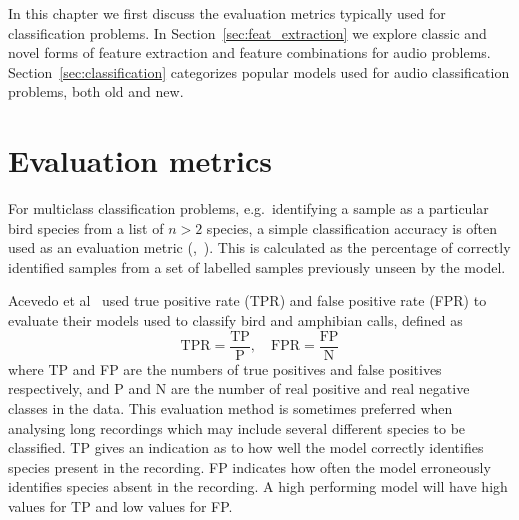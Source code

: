 In this chapter we first discuss the evaluation metrics typically used for
classification problems. In Section~\ref{sec:feat_extraction} we explore classic
and novel forms of feature extraction and feature combinations for audio
problems. Section~\ref{sec:classification} categorizes popular models used for
audio classification problems, both old and new.

\section{Evaluation metrics}\label{sec:eval_metrics}

For multiclass classification problems, e.g.\ identifying a sample as a
particular bird species from a list of $n > 2$ species, a simple classification
accuracy is often used as an evaluation metric
(\cite{chakraborty2016bird},~\cite{ramashini2022robust}). This is calculated as
the percentage of correctly identified samples from a set of labelled samples
previously unseen by the model.

Acevedo et al~\cite{acevedo2009automated} used true positive rate (TPR) and false
positive rate (FPR) to evaluate their models used to classify bird and amphibian
calls, defined as
\begin{equation}
  \text{TPR} = \frac{\text{TP}}{\text{P}}, \hspace{1em}
  \text{FPR} = \frac{\text{FP}}{\text{N}}
\end{equation}
where TP and FP are the numbers of true positives and false positives
respectively, and P and N are the number of real positive and real negative
classes in the data. This evaluation method is sometimes preferred when
analysing long recordings which may include several different species to be
classified. TP gives an indication as to how well the model correctly identifies
species present in the recording. FP indicates how often the model erroneously
identifies species absent in the recording. A high performing model will have
high values for TP and low values for FP\@.


